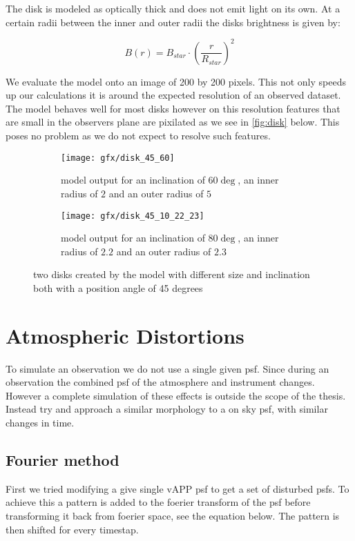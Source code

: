 The disk is modeled as optically thick and does not emit light on its own. At a certain radii between the inner and outer radii the disks brightness is given by:

\begin{equation}
B(r) = B_{star} \cdot {\left(\frac{r}{R_{star}}\right)}^2
\end{equation}

We evaluate the model onto an image of 200 by 200 pixels. This not only speeds up our calculations it is around the expected resolution of an observed dataset. The model behaves well for most disks however on this resolution features that are small in the observers plane are pixilated as we see in \autoref{fig:disk} below. This poses no problem as we do not expect to resolve such features.

\begin{figure}[h!]
  \begin{subfigure}[b]{0.5\textwidth}
    \texttt{[image: gfx/disk\_45\_60]}
    \caption{model output for an inclination of $60\deg$, an inner radius of $2$ and an outer radius of $5$}
  \end{subfigure}
  \begin{subfigure}[b]{0.5\textwidth}
    \texttt{[image: gfx/disk\_45\_10\_22\_23]}
    \caption{model output for an inclination of $80\deg$, an inner radius of $2.2$ and an outer radius of $2.3$}
  \end{subfigure}
  \caption{two disks created by the model with different size and inclination both with a position angle of 45 degrees}
  \label{fig:disk}
\end{figure}





\section{Atmospheric Distortions}

To simulate an observation we do not use a single given psf. Since during an observation the combined psf of the atmosphere and instrument changes. However a complete simulation of these effects is outside the scope of the thesis. Instead try and approach a similar morphology to a on sky psf, with similar changes in time.

\subsection{Fourier method}
First we tried modifying a give single \ac{vAPP} psf to get a set of disturbed psfs. To achieve this a pattern is added to the foerier transform of the psf before transforming it back from foerier space, see the equation below. The pattern is then shifted for every timestap.

